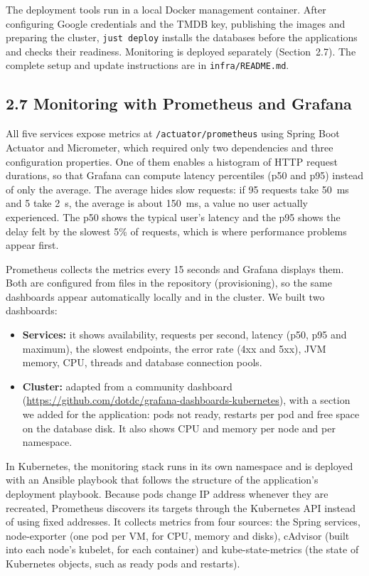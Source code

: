 \documentclass[10pt,a4paper]{article}
\begin{document}
The deployment tools run in a local Docker management container. After configuring Google credentials and the TMDB key, publishing the images and preparing the cluster, \texttt{just deploy} installs the databases before the applications and checks their readiness. Monitoring is deployed separately (Section~2.7). The complete setup and update instructions are in \texttt{infra/README.md}.

\subsection*{2.7 Monitoring with Prometheus and Grafana}

All five services expose metrics at \texttt{/actuator/prometheus} using Spring Boot Actuator and Micrometer, which required only two dependencies and three configuration properties. One of them enables a histogram of HTTP request durations, so that Grafana can compute latency percentiles (p50 and p95) instead of only the average. The average hides slow requests: if 95 requests take 50~ms and 5 take 2~s, the average is about 150~ms, a value no user actually experienced. The p50 shows the typical user's latency and the p95 shows the delay felt by the slowest 5\% of requests, which is where performance problems appear first.

Prometheus collects the metrics every 15 seconds and Grafana displays them. Both are configured from files in the repository (provisioning), so the same dashboards appear automatically locally and in the cluster. We built two dashboards:
\begin{itemize}
  \item \textbf{Services:} it shows availability, requests per second, latency (p50, p95 and maximum), the slowest endpoints, the error rate (4xx and 5xx), JVM memory, CPU, threads and database connection pools.
  \item \textbf{Cluster:} adapted from a community dashboard (\url{https://github.com/dotdc/grafana-dashboards-kubernetes}), with a section we added for the application: pods not ready, restarts per pod and free space on the database disk. It also shows CPU and memory per node and per namespace.
\end{itemize}

In Kubernetes, the monitoring stack runs in its own namespace and is deployed with an Ansible playbook that follows the structure of the application's deployment playbook. Because pods change IP address whenever they are recreated, Prometheus discovers its targets through the Kubernetes API instead of using fixed addresses. It collects metrics from four sources: the Spring services, node-exporter (one pod per VM, for CPU, memory and disks), cAdvisor (built into each node's kubelet, for each container) and kube-state-metrics (the state of Kubernetes objects, such as ready pods and restarts).
\end{document}

